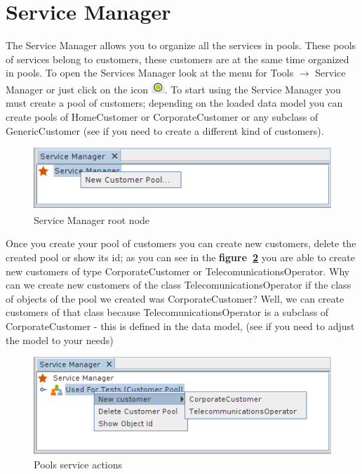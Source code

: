 \documentclass[a4paper]{article}
\begin{document}
	\newpage
	\section{Service Manager} \label{sec:service_manager}
	
	The Service Manager allows you to organize all the services in pools. These pools of services belong to customers, these customers are at the same time organized in pools. To open the Services Manager look at the menu for Tools $\rightarrow$ Service Manager or just click on the icon \includegraphics[width=0.5cm]{img/icon_service_manager.png}.   
	To start using the Service Manager you must create a pool of customers; depending on the loaded data model you can create pools of HomeCustomer or CorporateCustomer or any subclass of GenericCustomer (see \textbf{} if you need to create a different kind of customers).  

	\begin{figure}[h!]
		\centering
		\includegraphics[width=0.6\linewidth]{img/sm_root_node.png}
		\caption{Service Manager root node}
		\label{fig:sm_root_node}
	\end{figure}

	Once you create your pool of customers you can create new customers, delete the created pool or show its id; as you can see in the \textbf{figure~\ref{fig:sm_pools_service_actions}} you are able to create new customers of type CorporateCustomer or TelecomunicationsOperator. Why can we create new customers of the class TelecomunicationsOperator if the class of objects of the pool we created was CorporateCustomer? Well, we can create customers of that class because TelecomunicationsOperator is a subclass of CorporateCustomer - this is defined in the data model, (see \textbf{} if you need to adjust the model to your needs)
	
	\begin{figure}[h!]
		\centering
		\includegraphics[width=0.6\linewidth]{img/sm_pools_service_actions.png}
		\caption{Pools service actions}
		\label{fig:sm_pools_service_actions}
	\end{figure}
    
\end{document}
